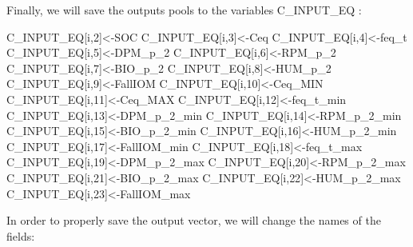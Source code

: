 \documentclass[
  10pt,
  b5paper,
]{book}
\newenvironment{Shaded}{\begin{snugshade}}{\end{snugshade}}
\newcommand{\DecValTok}[1]{\textcolor[rgb]{0.00,0.00,0.81}{#1}}
\newcommand{\NormalTok}[1]{#1}
\begin{document}
Finally, we will save the outputs pools to the variables C\_INPUT\_EQ :

\begin{Shaded}
\begin{Highlighting}[]
\NormalTok{C_INPUT_EQ[i,}\DecValTok{2}\NormalTok{]<-SOC}
\NormalTok{C_INPUT_EQ[i,}\DecValTok{3}\NormalTok{]<-Ceq}
\NormalTok{C_INPUT_EQ[i,}\DecValTok{4}\NormalTok{]<-feq_t}
\NormalTok{C_INPUT_EQ[i,}\DecValTok{5}\NormalTok{]<-DPM_p_}\DecValTok{2}
\NormalTok{C_INPUT_EQ[i,}\DecValTok{6}\NormalTok{]<-RPM_p_}\DecValTok{2}
\NormalTok{C_INPUT_EQ[i,}\DecValTok{7}\NormalTok{]<-BIO_p_}\DecValTok{2}
\NormalTok{C_INPUT_EQ[i,}\DecValTok{8}\NormalTok{]<-HUM_p_}\DecValTok{2}
\NormalTok{C_INPUT_EQ[i,}\DecValTok{9}\NormalTok{]<-FallIOM}
\NormalTok{C_INPUT_EQ[i,}\DecValTok{10}\NormalTok{]<-Ceq_MIN}
\NormalTok{C_INPUT_EQ[i,}\DecValTok{11}\NormalTok{]<-Ceq_MAX}
\NormalTok{C_INPUT_EQ[i,}\DecValTok{12}\NormalTok{]<-feq_t_min}
\NormalTok{C_INPUT_EQ[i,}\DecValTok{13}\NormalTok{]<-DPM_p_}\DecValTok{2}\NormalTok{_min}
\NormalTok{C_INPUT_EQ[i,}\DecValTok{14}\NormalTok{]<-RPM_p_}\DecValTok{2}\NormalTok{_min}
\NormalTok{C_INPUT_EQ[i,}\DecValTok{15}\NormalTok{]<-BIO_p_}\DecValTok{2}\NormalTok{_min}
\NormalTok{C_INPUT_EQ[i,}\DecValTok{16}\NormalTok{]<-HUM_p_}\DecValTok{2}\NormalTok{_min}
\NormalTok{C_INPUT_EQ[i,}\DecValTok{17}\NormalTok{]<-FallIOM_min}
\NormalTok{C_INPUT_EQ[i,}\DecValTok{18}\NormalTok{]<-feq_t_max}
\NormalTok{C_INPUT_EQ[i,}\DecValTok{19}\NormalTok{]<-DPM_p_}\DecValTok{2}\NormalTok{_max}
\NormalTok{C_INPUT_EQ[i,}\DecValTok{20}\NormalTok{]<-RPM_p_}\DecValTok{2}\NormalTok{_max}
\NormalTok{C_INPUT_EQ[i,}\DecValTok{21}\NormalTok{]<-BIO_p_}\DecValTok{2}\NormalTok{_max}
\NormalTok{C_INPUT_EQ[i,}\DecValTok{22}\NormalTok{]<-HUM_p_}\DecValTok{2}\NormalTok{_max}
\NormalTok{C_INPUT_EQ[i,}\DecValTok{23}\NormalTok{]<-FallIOM_max}
\end{Highlighting}
\end{Shaded}

In order to properly save the output vector, we will change the names of the fields:
\end{document}
